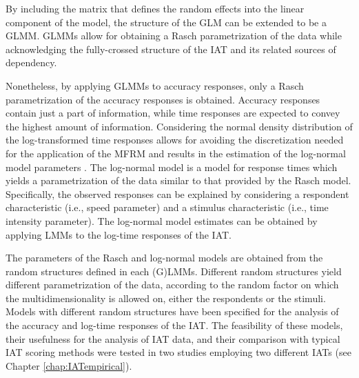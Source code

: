 \documentclass[12pt]{book}
\begin{document}
By including the matrix that defines the random effects into the linear component of the model, the structure of the GLM can be extended to be a GLMM. 
GLMMs allow for obtaining a Rasch parametrization of the data while acknowledging the fully-crossed structure of the IAT and its related sources of dependency. 


Nonetheless, by applying GLMMs to accuracy responses, only a Rasch parametrization of the accuracy responses is obtained. 
Accuracy responses contain just a part of information, while time responses are expected to convey the highest amount of information. 
Considering the normal density distribution of the log-transformed time responses allows for avoiding the discretization needed for the application of the MFRM and results in the estimation of the log-normal model parameters \cite{van2006}. 
The log-normal model is a model for response times which yields a parametrization of the data similar to that provided by the Rasch model. 
Specifically, the observed responses can be explained by considering a respondent characteristic (i.e., speed parameter) and a stimulus characteristic (i.e., time intensity parameter). The log-normal model estimates can be obtained by applying LMMs to the log-time responses of the IAT. 

The parameters of the Rasch and log-normal models are obtained from the random structures defined in each (G)LMMs. Different random structures yield different parametrization of the data, according to the random factor on which the multidimensionality is allowed on, either the respondents or the stimuli. 
Models with different random structures have been specified for the analysis of the accuracy and log-time responses of the IAT.	The feasibility of these models, their usefulness for the analysis of IAT data, and their comparison with typical IAT scoring methods were tested in two studies employing two different IATs (see Chapter \ref{chap:IATempirical}). 
\end{document}
